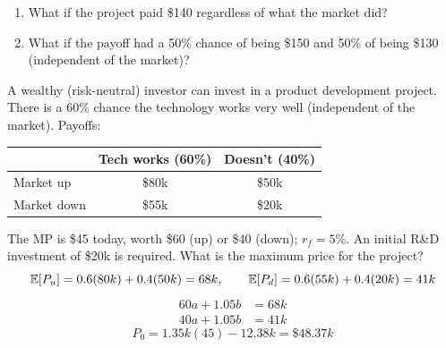 \begin{example}
    \begin{enumerate}[label = \alph*)]
        \item What if the project paid \$140 regardless of what the market did?
        \\
        \item What if the payoff had a 50\% chance of being \$150 and 50\% of being \$130 (independent of the market)?
        \\
    \end{enumerate}
\end{example}

\begin{example}
    A wealthy (risk-neutral) investor can invest in a product development
    project. There is a 60\% chance the technology works very well
    (independent of the market). Payoffs:
    \begin{center}
    \begin{tabular}{lcc}
        \toprule
        & Tech works (60\%) & Doesn't (40\%) \\
        \midrule
        Market up & \$80k & \$50k \\
        Market down & \$55k & \$20k \\
        \bottomrule
    \end{tabular}
    \end{center}
    The MP is \$45 today, worth \$60 (up) or \$40 (down); $r_f = 5\%$. An
    initial R\&D investment of \$20k is required. What is the maximum price
    for the project?
    \\
    \[\mathbb{E}[P_u] = 0.6(80k) + 0.4(50k) = 68k, \qquad \mathbb{E}[P_d] = 0.6(55k) + 0.4(20k) = 41k\]
    \begin{align*}
        60a + 1.05b &= 68k\\
        40a + 1.05b &= 41k
    \end{align*}
    \[P_0 = 1.35k(45) - 12.38k = \$48.37k\]
\end{example}

